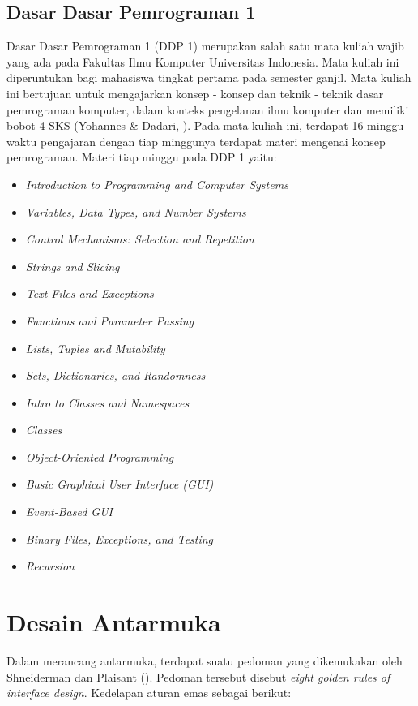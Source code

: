 	\subsection{Dasar Dasar Pemrograman 1}
	Dasar Dasar Pemrograman 1 (DDP 1) merupakan salah satu mata kuliah wajib yang ada pada Fakultas Ilmu Komputer Universitas Indonesia. Mata kuliah ini diperuntukan bagi mahasiswa tingkat pertama pada semester ganjil. Mata kuliah ini bertujuan untuk mengajarkan konsep - konsep dan teknik - teknik dasar pemrograman komputer, dalam konteks pengelanan ilmu komputer dan memiliki bobot 4 SKS (Yohannes \& Dadari, \citeyear{brp.ddp1}).
	\linebreak\linebreak
	Pada mata kuliah ini, terdapat 16 minggu waktu pengajaran dengan tiap minggunya terdapat materi mengenai konsep pemrograman. Materi tiap minggu pada DDP 1 yaitu:
	\begin{itemize}
		\item \textit{Introduction to Programming and Computer Systems}
		\item \textit{Variables, Data Types, and Number Systems}
		\item \textit{Control Mechanisms: Selection and Repetition}
		\item \textit{Strings and Slicing}
		\item \textit{Text Files and Exceptions}
		\item \textit{Functions and Parameter Passing}
		\item \textit{Lists, Tuples and Mutability}
		\item \textit{Sets, Dictionaries, and Randomness}
		\item \textit{Intro to Classes and Namespaces}
		\item \textit{Classes}
		\item \textit{Object-Oriented Programming}
		\item \textit{Basic Graphical User Interface (GUI)}
		\item \textit{Event-Based GUI}
		\item \textit{Binary Files, Exceptions, and Testing}
		\item \textit{Recursion}
	\end{itemize}
	
\section{Desain Antarmuka}
Dalam merancang antarmuka, terdapat suatu pedoman yang dikemukakan oleh Shneiderman dan Plaisant (\citeyear{papper.shneiderman}).
Pedoman tersebut disebut \textit{eight golden rules of interface design}. Kedelapan aturan emas sebagai berikut:

